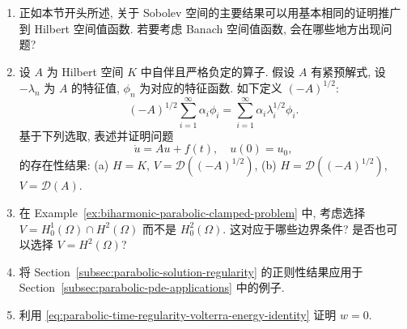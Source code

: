 \begin{enumerate}[label=\thesection.\arabic*.,ref=\thesection.\arabic*,start=1,series=book-problems]

\item\label{ex:banach-valued-sobolev-generalization-obstructions} 正如本节开头所述, 关于 Sobolev 空间的主要结果可以用基本相同的证明推广到 Hilbert 空间值函数. 若要考虑 Banach 空间值函数, 会在哪些地方出现问题?

\item\label{ex:spectral-square-root-parabolic-space-choices} 设 $A$ 为 Hilbert 空间 $K$ 中自伴且严格负定的算子. 假设 $A$ 有紧预解式, 设 $-\lambda_n$ 为 $A$ 的特征值, $\phi_n$ 为对应的特征函数. 如下定义 $(-A)^{1/2}$:
\begin{equation}\label{eq:negative-self-adjoint-operator-spectral-square-root}
(-A)^{1/2}\sum_{i=1}^\infty\alpha_i\phi_i=\sum_{i=1}^\infty\alpha_i\lambda_i^{1/2}\phi_i.
\end{equation}
基于下列选取, 表述并证明问题\[\dot u=Au+f(t),\quad u(0)=u_0,\]的存在性结果: (a) $H=K$, $V=\mathcal{D}((-A)^{1/2})$, (b) $H=\mathcal{D}((-A)^{1/2})$, $V=\mathcal{D}(A)$.

\item\label{ex:biharmonic-parabolic-alternative-boundary-spaces} 在 Example~\ref{ex:biharmonic-parabolic-clamped-problem} 中, 考虑选择 $V=H_0^1(\Omega)\cap H^2(\Omega)$ 而不是 $H_0^2(\Omega)$. 这对应于哪些边界条件? 是否也可以选择 $V=H^2(\Omega)$?

\item\label{ex:parabolic-regularity-applications} 将 Section~\ref{subsec:parabolic-solution-regularity} 的正则性结果应用于 Section~\ref{subsec:parabolic-pde-applications} 中的例子.

\item\label{ex:parabolic-volterra-energy-zero-solution} 利用 \eqref{eq:parabolic-time-regularity-volterra-energy-identity} 证明 $w=0$.

\end{enumerate}
